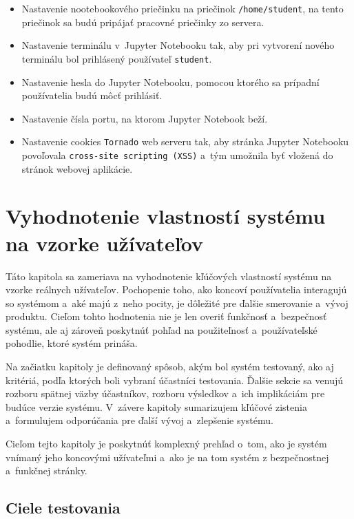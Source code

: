 \begin{itemize}
    \item Nastavenie nootebookového priečinku na priečinok \verb|/home/student|, na tento priečinok sa budú pripájať pracovné priečinky zo servera. 
    \item Nastavenie terminálu v~Jupyter Notebooku tak, aby pri vytvorení nového terminálu bol prihlásený používateľ \verb|student|.
    \item Nastavenie hesla do Jupyter Notebooku, pomocou ktorého sa prípadní používatelia budú môcť prihlásiť.
    \item Nastavenie čísla portu, na ktorom Jupyter Notebook beží.
    \item Nastavenie cookies \verb|Tornado| web serveru tak, aby stránka Jupyter Notebooku povoľovala \verb|cross-site scripting (XSS)| a~tým umožnila byť vložená do stránok webovej aplikácie.
\end{itemize}




\chapter{Vyhodnotenie vlastností systému na vzorke užívateľov} 
\label{testovanie}

Táto kapitola sa zameriava na vyhodnotenie kľúčových vlastností systému na vzorke reálnych užívateľov. Pochopenie toho, ako koncoví používatelia interagujú so systémom a~aké majú z~neho pocity, je dôležité pre ďalšie smerovanie a~vývoj produktu. Cieľom tohto hodnotenia nie je len overiť funkčnosť a~bezpečnosť systému, ale aj zároveň poskytnúť pohľad na použiteľnosť a~používateľské pohodlie, ktoré systém prináša.

Na začiatku kapitoly je definovaný spôsob, akým bol systém testovaný, ako aj kritériá, podľa ktorých boli vybraní účastníci testovania. Ďalšie sekcie sa venujú rozboru spätnej väzby účastníkov, rozboru výsledkov a~ich implikáciám pre budúce verzie systému. V~závere kapitoly sumarizujem kľúčové zistenia a~formulujem odporúčania pre ďalší vývoj a~zlepšenie systému.

Cieľom tejto kapitoly je poskytnúť komplexný prehľad o~tom, ako je systém vnímaný jeho koncovými užívateľmi a~ako je na tom systém z bezpečnostnej a~funkčnej stránky.

\section{Ciele testovania}

